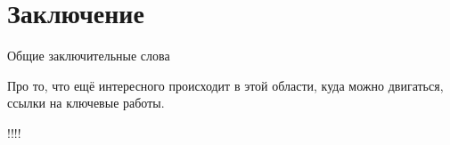 ﻿\chapter{Заключение}

Общие заключительные слова

Про то, что ещё интересного происходит в этой области, куда можно двигаться, ссылки на ключевые работы.

!!!!